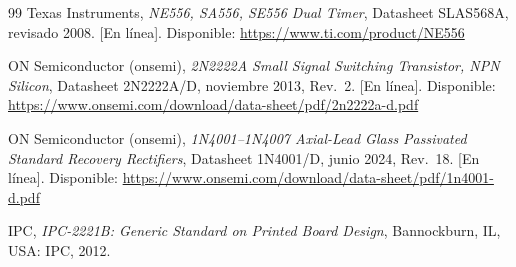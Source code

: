 \documentclass[10pt,onecolumn]{IEEEtran}
\begin{document}
\begin{thebibliography}{99}
 Texas Instruments, \emph{NE556, SA556, SE556 Dual Timer}, Datasheet SLAS568A, revisado 2008. [En línea]. Disponible: \url{https://www.ti.com/product/NE556}

 ON Semiconductor (onsemi), \emph{2N2222A Small Signal Switching Transistor, NPN Silicon}, Datasheet 2N2222A/D, noviembre 2013, Rev.~2. [En línea]. Disponible: \url{https://www.onsemi.com/download/data-sheet/pdf/2n2222a-d.pdf}

 ON Semiconductor (onsemi), \emph{1N4001--1N4007 Axial-Lead Glass Passivated Standard Recovery Rectifiers}, Datasheet 1N4001/D, junio 2024, Rev.~18. [En línea]. Disponible: \url{https://www.onsemi.com/download/data-sheet/pdf/1n4001-d.pdf}

 IPC, \emph{IPC-2221B: Generic Standard on Printed Board Design}, Bannockburn, IL, USA: IPC, 2012.

\end{thebibliography}
\end{document}
